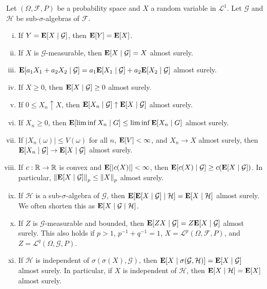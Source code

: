		\begin{lemma}
			Let $(\Omega,\mathcal{F},P)$ be a probability space and $X$ a random variable in $\mathcal{L}^1$. Let $\mathcal{G}$ and $\mathcal{H}$ be sub-$\sigma$-algebras of $\mathcal{F}$.
			\begin{enumerate}[(i)]
				\item If $Y=\textbf{E}[X\mid\mathcal{G}]$, then $\textbf{E}[Y]=\textbf{E}[X]$.
				\item If $X$ is $\mathcal{G}$-measurable, then $\textbf{E}[X\mid\mathcal{G}]=X$ almost surely.
				\item $\textbf{E}[a_1X_1 + a_2X_2\mid\mathcal{G}] = a_1\textbf{E}[X_1\mid\mathcal{G}] + a_2\textbf{E}[X_2\mid\mathcal{G}]$ almost surely.
				\item If $X\geq 0$, then $\textbf{E}[X\mid\mathcal{G}]\geq 0$ almost surely.
				\item If $0\leq X_n\uparrow X$, then $\textbf{E}[X_n\mid\mathcal{G}]\uparrow\textbf{E}[X\mid\mathcal{G}]$ almost surely.
				\item If $X_n\geq 0$, then $\textbf{E}[\liminf X_n\mid G] \leq \liminf \textbf{E}[X_n\mid G]$ almost surely.
				\item If $|X_n(\omega)|\leq V(\omega)$ for all $n$, $\textbf{E}[V]<\infty$, and $X_n\to X$ almost surely, then $\textbf{E}[X_n\mid\mathcal{G}] \to \textbf{E}[X\mid\mathcal{G}]$ almost surely.
				\item If $c:\mathbb{R}\to\mathbb{R}$ is convex and $\textbf{E}[|c(X)|]<\infty$, then $\textbf{E}[c(X)\mid\mathcal{G}] \geq c(\textbf{E}[X\mid\mathcal{G}])$. In particular, $\left\lVert\textbf{E}[X\mid\mathcal{G}]\right\rVert_p \leq \left\lVert X\right\rVert_p$ almost surely.
				\item If $\mathcal{H}$ is a sub-$\sigma$-algebra of $\mathcal{G}$, then $\textbf{E}[\textbf{E}[X\mid\mathcal{G}]\mid\mathcal{H}] = \textbf{E}[X\mid\mathcal{H}]$ almost surely. We often shorten this as $\textbf{E}[X\mid\mathcal{G}\mid\mathcal{H}]$.
				\item If $Z$ is $\mathcal{G}$-measurable and bounded, then $\textbf{E}[ZX\mid\mathcal{G}]=Z\textbf{E}[X\mid\mathcal{G}]$ almost surely. This also holds if $p>1$, $p^{-1}+q^{-1}=1$, $X=\mathcal{L}^p(\Omega,\mathcal{F},P)$, and $Z=\mathcal{L}^q(\Omega,\mathcal{G},P)$.
				\item If $\mathcal{H}$ is independent of $\sigma(\sigma(X),\mathcal{G})$, then $\textbf{E}[X\mid\sigma(\mathcal{G},\mathcal{H})] = \textbf{E}[X\mid\mathcal{G}]$ almost surely. In particular, if $X$ is independent of $\mathcal{H}$, then $\textbf{E}[X\mid\mathcal{H}]=\textbf{E}[X]$ almost surely.
			\end{enumerate}
		\end{lemma}

